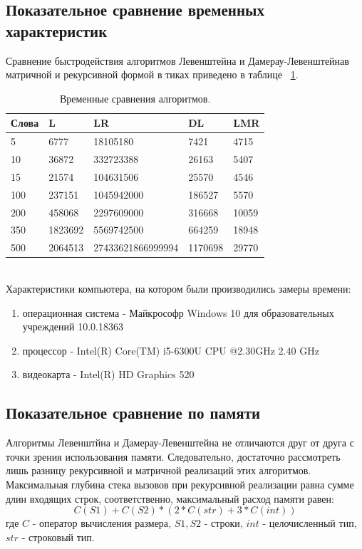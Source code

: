 \documentclass[a4paper]{article}
\begin{document}
	\subsection{Показательное сравнение временных характеристик}
	Сравнение быстродействия алгоритмов Левенштейна и Дамерау-Левенштейнав матричной и рекурсивной формой в тиках приведено в таблице ~\ref{tab:vremya1}. 
	\begin{table}[h]
		\caption{\label{tab:vremya1} Временные сравнения алгоритмов.}
			\begin{center}
				\begin{tabular}{|p{70pt}|p{100pt}|p{130pt}|p{90pt}|p{70pt}|}
					\hline
					Слова & L & LR & DL & LMR\\ \hline
					5 &  6777 &18105180  & 7421 & 4715\\	\hline
					10 & 36872 &332723388 & 26163 & 5407\\ \hline
					15 & 21574 &104631506 & 25570 & 4546\\ \hline
					100 &237151 & 1045942000 & 186527 & 5570 \\ \hline
					200 &458068 & 2297609000 & 316668 & 10059 \\ \hline
					350 &1823692& 5569742500 & 664259 & 18948 \\ \hline
					500 &2064513 & 27433621866999994 & 1170698 & 29770 \\ \hline
				\end{tabular}
			\end{center}
	\end{table}\\
	Характеристики компьютера, на котором были производились замеры времени:
	\begin{enumerate}
		\item операционная система - Майкрософр Windows 10 для образовательных учреждений 10.0.18363
		\item процессор - Intel(R) Core(TM) i5-6300U CPU @2.30GHz 2.40 GHz
		\item видеокарта - Intel(R) HD Graphics 520
	\end{enumerate}
	\clearpage
	\subsection{Показательное сравнение по памяти}
	Алгоритмы Левенштйна и Дамерау-Левенштейна не отличаются друг от друга с точки зрения использования памяти. Следовательно, достаточно рассмотреть лишь разницу рекурсивной и матричной реализаций этих алгоритмов. Максимальная глубина стека вызовов при рекурсивной реализации равна сумме длин входящих строк, соответственно, максимальный расход памяти равен:
	\begin{equation}
	C(S1) + C(S2) * (2 * C(str) + 3*C(int))
	\end{equation}
	\label{pamyat1}	
	где $C$ - оператор вычисления размера, $S1, S2$ - строки, $int$ - целочисленный тип, $str$ - строковый тип.
	
\end{document}
